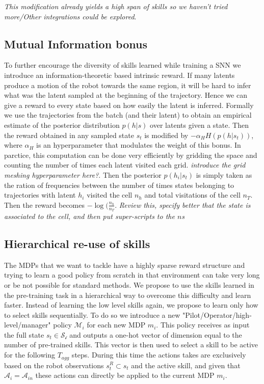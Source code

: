 \documentclass{article} %
\begin{document}
\textit{This modification already yields a high span of skills so we haven't tried more/Other integrations could be explored}.

\subsection{Mutual Information bonus}
To further encourage the diversity of skills learned while training a SNN we introduce an information-theoretic based intrinsic reward. If many latents produce a motion of the robot towards the same region, it will be hard to infer what was the latent sampled at the beginning of the trajectory. Hence we can give a reward to every state based on how easily the latent is inferred. Formally we use the trajectories from the batch (and their latent) to obtain an empirical estimate of the posterior distribution $p(h|s)$ over latents given a state. Then the reward obtained in any sampled state $s_t$ is modified by $-\alpha_H H(p(h|s_t))$, where $\alpha_H$ is an hyperparameter that modulates the weight of this bonus. In parctice, this computation can be done very efficiently by gridding the space and counting the number of times each latent visited each grid. \textit{introduce the grid meshing hyperparameter here?}. Then the posterior $p(h_i|s_t)$ is simply taken as the ration of frequencies between the number of times states belonging to trajectories with latent $h_i$ visited the cell $n_h$ and total visitations of the cell $n_T$. Then the reward becomes $-\log(\frac{n_h}{n_T}$. \textit{Review this, specify better that the state is associated to the cell, and then put super-scripts to the $n$s}

\subsection{Hierarchical re-use of skills}
The MDPs that we want to tackle have a highly sparse reward structure and trying to learn a good policy from scratch in that environment can take very long or be not possible for standard methods. We propose to use the skills learned in the pre-training task in a hierarchical way to overcome this difficulty and learn faster. Instead of learning the low level skills again, we propose to learn only how to select skills sequentially. To do so we introduce a new "Pilot/Operator/high-level/manager" policy $\mathcal{M}_i$ for each new MDP $m_i$. This policy receives as input the full state $s_t\in \mathcal{S_i}$ and outputs a one-hot vector of dimension equal to the number of pre-trained skills. This vector is then used to select a skill to be active for the following $T_{agg}$ steps. During this time the actions takes are exclusively based on the robot observations $s^R_t\subset s_t$ and the active skill, and given that $\mathcal{A}_i = \mathcal{A}_{in}$ these actions can directly be applied to the current MDP $m_i$.
\end{document}
